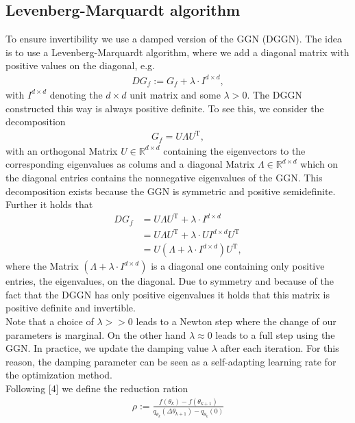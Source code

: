 \documentclass[conference]{IEEEtran}
\begin{document}
\subsection{Levenberg-Marquardt algorithm }
\noindent
To ensure invertibility we use a damped version of the GGN (DGGN). The idea is to use a Levenberg-Marquardt algorithm, where we add a diagonal matrix with positive values on the diagonal, e.g.
\begin{align}
DG_{f} := G_{f} + \lambda\cdot I^{d\times d},
\end{align}
with $I^{d\times d}$ denoting the $d\times d$ unit matrix and some $\lambda>0$.
The DGGN constructed this way is always positive definite. 
To see this, we consider the decomposition
\begin{align}
G_{f} = U\Lambda U^{\mathrm{T}},
\end{align}
with an orthogonal Matrix $U\in\mathbb{R}^{d\times d}$ containing the eigenvectors to the corresponding eigenvalues as colums and a diagonal Matrix $\Lambda\in\mathbb{R}^{d\times d}$ which on the diagonal entries contains the nonnegative eigenvalues of the GGN. This decomposition exists because the GGN is symmetric and positive semidefinite. Further it holds that
\begin{align}
DG_{f} &= U\Lambda U^{\mathrm{T}} + \lambda\cdot I^{d\times d}\\
&= U\Lambda U^{\mathrm{T}} + \lambda\cdot U I^{d\times d}U^{\mathrm{T}}\\
&= U\left(\Lambda + \lambda\cdot I^{d\times d}\right)U^{\mathrm{T}},
\end{align}
where the Matrix $\left(\Lambda + \lambda\cdot I^{d\times d}\right)$ is a diagonal one containing only positive entries, the eigenvalues, on the diagonal. Due to symmetry and because of the fact that the DGGN has only positive eigenvalues it holds that this matrix is positive definite and invertible.\\
Note that a choice of $\lambda>>0$ leads to a Newton step where the change of our parameters is marginal. On the other hand $\lambda\approx 0$ leads to a full step using the GGN. In practice, we update the damping value $\lambda$ after each iteration. For this reason, the damping parameter can be seen as a self-adapting learning rate for the optimization method.\\
Following [4] we define the reduction ration
\begin{align}
\rho := \frac{f(\theta_{k}) - f(\theta_{k+1})}{q_{\theta_{k}}(\Delta\theta_{k + 1}) - q_{\theta_{k}}(0)}
\end{align}
\end{document}
